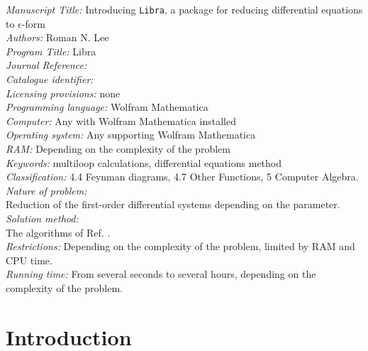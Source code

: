 \documentclass[sort&compress]{elsarticle}
\newcommand{\Libra}{\texttt{Libra}}
\begin{document}
\begin{small}
\noindent
{\em Manuscript Title:} {Introducing \Libra, a package for reducing differential equations to $\epsilon$-form}                        \\
{\em Authors:} Roman N. Lee \\
{\em Program Title:} Libra                               \\
{\em Journal Reference:}                                      \\
{\em Catalogue identifier:}                                   \\
{\em Licensing provisions:} none                               \\
{\em Programming language:} Wolfram Mathematica                \\
{\em Computer:} Any with Wolfram Mathematica installed\\
{\em Operating system:} Any supporting Wolfram Mathematica     \\
{\em RAM:} Depending on the complexity of the problem         \\
{\em Keywords:} multiloop calculations, differential equations method  \\
{\em Classification:}  4.4 Feynman diagrams, 4.7 Other Functions, 5 Computer Algebra.                                        \\
{\em Nature of problem:}\\
Reduction of the first-order differential systems depending on the parameter. \\
{\em Solution method:}\\
The algorithms of Ref. . \\
{\em Restrictions:} Depending on the complexity of the problem, limited by RAM and CPU time. \\
{\em Running time:} From several seconds to several hours, depending on the complexity of the problem.\\
\end{small}

\section*{Introduction}
\end{document}
